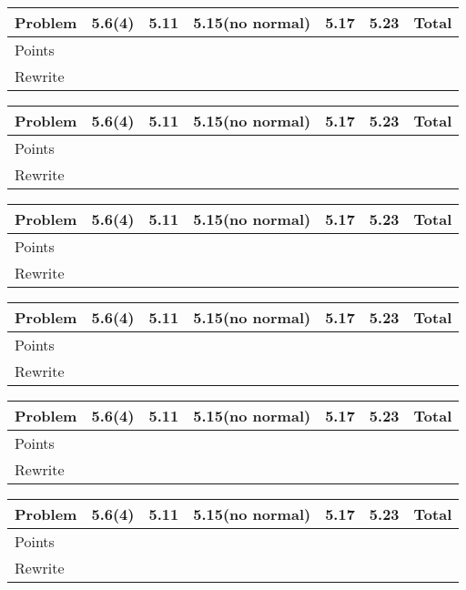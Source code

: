 \documentclass{fkpset}
\begin{document}
\begin{table}[H]
  \centering
  \begin{tabular}{lcccccr} \toprule
    Problem & 5.6(4) & 5.11 & 5.15(no normal) & 5.17 & 5.23 & Total \\
    \midrule
    Points & \\\midrule
    Rewrite & \\\bottomrule
  \end{tabular}
\end{table}
\begin{table}[H]
  \centering
  \begin{tabular}{lcccccr} \toprule
    Problem & 5.6(4) & 5.11 & 5.15(no normal) & 5.17 & 5.23 & Total \\
    \midrule
    Points & \\\midrule
    Rewrite & \\\bottomrule
  \end{tabular}
\end{table}
\begin{table}[H]
  \centering
  \begin{tabular}{lcccccr} \toprule
    Problem & 5.6(4) & 5.11 & 5.15(no normal) & 5.17 & 5.23 & Total \\
    \midrule
    Points & \\\midrule
    Rewrite & \\\bottomrule
  \end{tabular}
\end{table}
\begin{table}[H]
  \centering
  \begin{tabular}{lcccccr} \toprule
    Problem & 5.6(4) & 5.11 & 5.15(no normal) & 5.17 & 5.23 & Total \\
    \midrule
    Points & \\\midrule
    Rewrite & \\\bottomrule
  \end{tabular}
\end{table}
\begin{table}[H]
  \centering
  \begin{tabular}{lcccccr} \toprule
    Problem & 5.6(4) & 5.11 & 5.15(no normal) & 5.17 & 5.23 & Total \\
    \midrule
    Points & \\\midrule
    Rewrite & \\\bottomrule
  \end{tabular}
\end{table}
\begin{table}[H]
  \centering
  \begin{tabular}{lcccccr} \toprule
    Problem & 5.6(4) & 5.11 & 5.15(no normal) & 5.17 & 5.23 & Total \\
    \midrule
    Points & \\\midrule
    Rewrite & \\\bottomrule
  \end{tabular}
\end{table}
\end{document}
